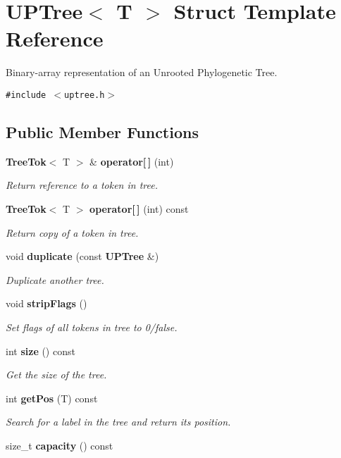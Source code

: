 \section{UPTree$<$ T $>$ Struct Template Reference}
\label{structUPTree}
Binary-array representation of an Unrooted Phylogenetic Tree.  


{\tt \#include $<$uptree.h$>$}

\subsection*{Public Member Functions}
\begin{CompactItemize}
\item 
{\bf Tree\-Tok}$<$ T $>$ \& {\bf operator[$\,$]} (int)
\begin{CompactList}\small\item\em Return reference to a token in tree. \item\end{CompactList}\item 
{\bf Tree\-Tok}$<$ T $>$ {\bf operator[$\,$]} (int) const 
\begin{CompactList}\small\item\em Return copy of a token in tree. \item\end{CompactList}\item 
void {\bf duplicate} (const {\bf UPTree} \&)
\begin{CompactList}\small\item\em Duplicate another tree. \item\end{CompactList}\item 
void {\bf strip\-Flags} ()
\begin{CompactList}\small\item\em Set flags of all tokens in tree to 0/false. \item\end{CompactList}\item 
int {\bf size} () const 
\begin{CompactList}\small\item\em Get the size of the tree. \item\end{CompactList}\item 
int {\bf get\-Pos} (T) const 
\begin{CompactList}\small\item\em Search for a label in the tree and return its position. \item\end{CompactList}\item 
size\_\-t {\bf capacity} () const 
\end{CompactItemize}
